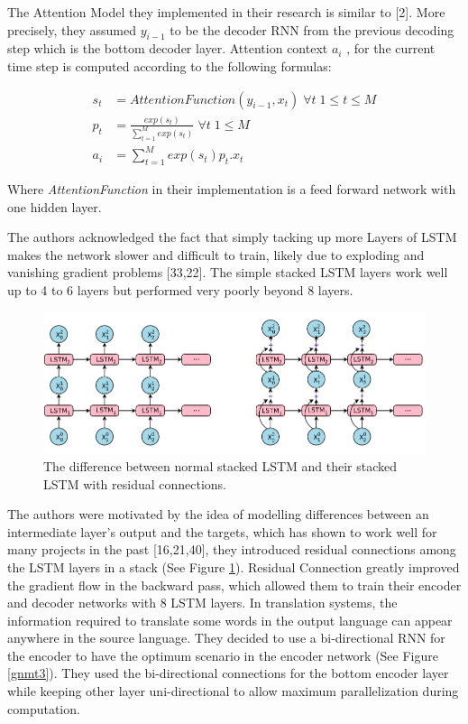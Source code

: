 The Attention Model they implemented in their research is similar to [2]. More precisely, they assumed $y_{i-1}$ to be the decoder RNN from the previous decoding step which is the bottom decoder layer. Attention context $a_i$ , for the current time step is computed according to the following formulas:

\begin{align*}
    s_t &= AttentionFunction(y_{i-1},x_t)\;\forall t \;1\leq t\leq M\\
    p_t &= \frac{exp(s_t)}{\sum_{t=1}^M exp(s_t)}\;\forall t \;1\leq M\\
    a_i &= \sum_{t=1}^M exp(s_t) p_t.x_t
\end{align*}


Where \textit{AttentionFunction} in their implementation is a feed forward network with one hidden layer.

The authors acknowledged the fact that simply tacking up more Layers of LSTM makes the network slower and difficult to train, likely due to exploding and vanishing gradient problems [33,22]. The simple stacked LSTM layers work well up to 4 to 6 layers but performed very poorly beyond 8 layers.

\begin{figure}
\includegraphics[width=\textwidth]{figures/gnmt2.png}
\caption{The difference between normal stacked LSTM and their stacked LSTM with residual connections.} \label{gnmt2}
\end{figure}

The authors were motivated by the idea of modelling differences between an intermediate layer’s output and the targets, which has shown to work well for many projects in the past [16,21,40], they introduced residual connections among the LSTM layers in a stack (See Figure \ref{gnmt2}). Residual Connection greatly improved the gradient flow in the backward pass, which allowed them to train their encoder and decoder networks with 8 LSTM layers. In translation systems, the information required to translate some words in the output language can appear anywhere in the source language. They decided to use a bi-directional RNN for the encoder to have the optimum scenario in the encoder network (See Figure \ref{gnmt3}). They used the bi-directional connections for the bottom encoder layer while keeping other layer uni-directional to allow maximum parallelization during computation. 

